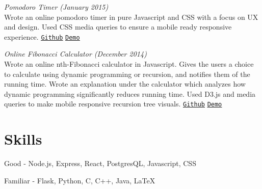 \documentclass[margin]{res}
\begin{document}
\begin{resume}
\textit{Pomodoro Timer (January 2015)}\\ Wrote an online pomodoro timer in pure Javascript and CSS with a focus on UX and design. Used CSS media queries to ensure a mobile ready responsive experience. \underline{\texttt{\href{https://github.com/keithyong/pomodoro}{Github}}} \underline{\texttt{\href{http://keithy.me/pomodoro}{Demo}}}


\textit{Online Fibonacci Calculator (December 2014)}\\ Wrote an online nth-Fibonacci calculator in Javascript. Gives the users a choice to calculate using dynamic programming or recursion, and notifies them of the running time. Wrote an explanation under the calculator which analyzes how dynamic programming significantly reduces running time. Used D3.js and media queries to make mobile responsive recursion tree visuals. \underline{\texttt{\href{https://github.com/keithyong/fibonacci-calc}{Github}}} \underline{\texttt{\href{http://keithy.me/fibonacci-calc}{Demo}}}


\section{Skills}
Good - Node.js, Express, React, PostgresQL, Javascript, CSS

Familiar - Flask, Python, C, C++, Java, LaTeX

\end{resume}
\end{document}
